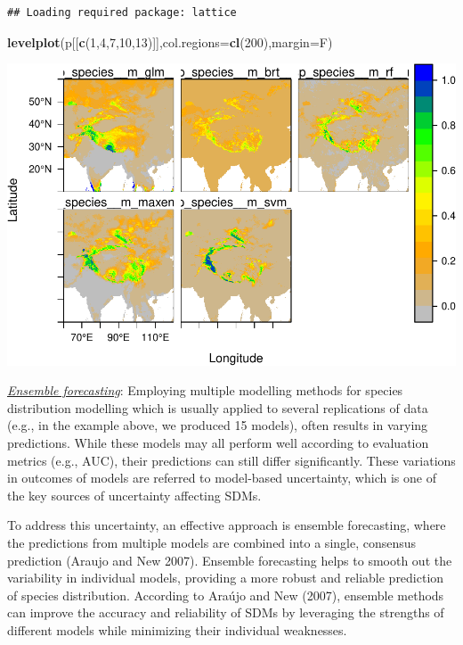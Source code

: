 \documentclass[
]{article}
\newenvironment{Shaded}{\begin{snugshade}}{\end{snugshade}}
\newcommand{\AttributeTok}[1]{\textcolor[rgb]{0.13,0.29,0.53}{#1}}
\newcommand{\DecValTok}[1]{\textcolor[rgb]{0.00,0.00,0.81}{#1}}
\newcommand{\FunctionTok}[1]{\textcolor[rgb]{0.13,0.29,0.53}{\textbf{#1}}}
\newcommand{\NormalTok}[1]{#1}
\begin{document}
\begin{verbatim}
## Loading required package: lattice
\end{verbatim}

\begin{Shaded}
\begin{Highlighting}[]
\FunctionTok{levelplot}\NormalTok{(p[[}\FunctionTok{c}\NormalTok{(}\DecValTok{1}\NormalTok{,}\DecValTok{4}\NormalTok{,}\DecValTok{7}\NormalTok{,}\DecValTok{10}\NormalTok{,}\DecValTok{13}\NormalTok{)]],}\AttributeTok{col.regions=}\FunctionTok{cl}\NormalTok{(}\DecValTok{200}\NormalTok{),}\AttributeTok{margin=}\NormalTok{F)}
\end{Highlighting}
\end{Shaded}

\includegraphics{sdm_R_files/figure-latex/unnamed-chunk-9-1.pdf}

\uline{\textit{Ensemble forecasting}}: Employing multiple modelling
methods for species distribution modelling which is usually applied to
several replications of data (e.g., in the example above, we produced 15
models), often results in varying predictions. While these models may
all perform well according to evaluation metrics (e.g., AUC), their
predictions can still differ significantly. These variations in outcomes
of models are referred to model-based uncertainty, which is one of the
key sources of uncertainty affecting SDMs.

To address this uncertainty, an effective approach is ensemble
forecasting, where the predictions from multiple models are combined
into a single, consensus prediction (Araujo and New 2007). Ensemble
forecasting helps to smooth out the variability in individual models,
providing a more robust and reliable prediction of species distribution.
According to Araújo and New (2007), ensemble methods can improve the
accuracy and reliability of SDMs by leveraging the strengths of
different models while minimizing their individual weaknesses.
\end{document}
